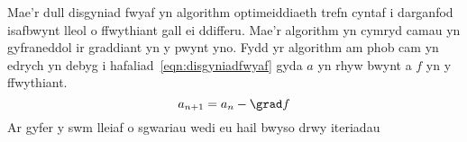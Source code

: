 Mae'r dull disgyniad fwyaf yn algorithm optimeiddiaeth trefn cyntaf i darganfod isafbwynt lleol o ffwythiant gall ei ddifferu. Mae'r algorithm yn cymryd camau yn gyfraneddol ir graddiant yn y pwynt yno. Fydd yr algorithm am phob cam yn edrych yn debyg i hafaliad~\ref{eqn:disgyniadfwyaf} gyda $a$ yn rhyw bwynt a $f$ yn y ffwythiant.
\begin{equation}\label{eqn:disgyniadfwyaf}
  a_{n+1} = a_{n} - \grad f
\end{equation}
Ar gyfer y swm lleiaf o sgwariau wedi eu hail bwyso drwy iteriadau
